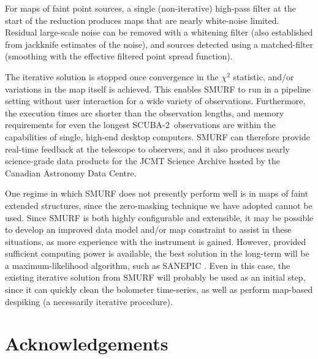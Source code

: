 \documentclass[useAMS,usenatbib,nofootinbib]{mn2e}
\newcommand{\scuba}{SCUBA-2}
\begin{document}
For maps of faint point sources, a single (non-iterative) high-pass
filter at the start of the reduction produces maps that are nearly
white-noise limited. Residual large-scale noise can be removed with a
whitening filter (also established from jackknife estimates of the
noise), and sources detected using a matched-filter (smoothing with
the effective filtered point spread function).

The iterative solution is stopped once convergence in the $\chi^2$
statistic, and/or variations in the map itself is achieved. This
enables SMURF to run in a pipeline setting without user interaction
for a wide variety of observations. Furthermore, the execution times
are shorter than the observation lengths, and memory requirements for
even the longest \scuba\ observations are within the capabilities of
single, high-end desktop computers. SMURF can therefore provide real-time
feedback at the telescope to observers, and it also produces nearly
science-grade data products for the JCMT Science Archive hosted by the
Canadian Astronomy Data Centre.

One regime in which SMURF does not presently perform well is in maps
of faint extended structures, since the zero-masking technique we have
adopted cannot be used. Since SMURF is both highly configurable and
extensible, it may be possible to develop an improved data model
and/or map constraint to assist in these situations, as more
experience with the instrument is gained. However, provided sufficient
computing power is available, the best solution in the long-term will
be a maximum-likelihood algorithm, such as SANEPIC
\citep{patanchon2008}. Even in this case, the existing iterative
solution from SMURF will probably be used as an initial step, since it
can quickly clean the bolometer time-series, as well as perform
map-based despiking (a necessarily iterative procedure).

\section{Acknowledgements}
\end{document}
